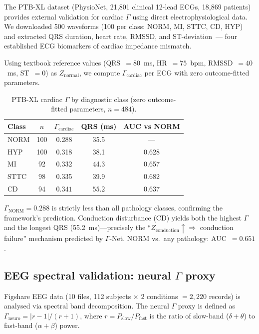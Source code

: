 \documentclass[aps,pre,twocolumn,superscriptaddress,floatfix]{revtex4-2}
\begin{document}
The PTB-XL dataset (PhysioNet, 21,801 clinical 12-lead ECGs,
18,869 patients) provides external validation for cardiac
$\Gamma$ using direct electrophysiological data.
We downloaded 500 waveforms (100 per class: NORM, MI, STTC,
CD, HYP) and extracted QRS duration, heart rate,
RMSSD, and ST-deviation~--- four established ECG biomarkers
of cardiac impedance mismatch.

Using textbook reference values (QRS~$= 80$~ms, HR~$= 75$~bpm,
RMSSD~$= 40$~ms, ST~$= 0$) as $Z_{\text{normal}}$,
we compute $\Gamma_{\text{cardiac}}$ per ECG with
zero outcome-fitted parameters.

\begin{table}[h]
\centering
\caption{PTB-XL cardiac $\Gamma$ by diagnostic class
  (zero outcome-fitted parameters, $n = 484$).}
\label{tab:ptbxl}
\begin{tabular}{lcccc}
\toprule
Class & $n$ & $\Gamma_{\text{cardiac}}$ & QRS (ms) & AUC vs NORM \\
\midrule
NORM  & 100 & 0.288     & 35.5 & ---   \\
HYP   & 100 & 0.318     & 38.1 & 0.628 \\
MI    &  92 & 0.332     & 44.3 & 0.657 \\
STTC  &  98 & 0.335     & 39.9 & $\mathbf{0.682}$ \\
CD    &  94 & $\mathbf{0.341}$ & $\mathbf{55.2}$ & 0.637 \\
\bottomrule
\end{tabular}
\end{table}

$\Gamma_{\text{NORM}} = 0.288$ is strictly less than
all pathology classes, confirming the framework's prediction.
Conduction disturbance (CD) yields both the highest $\Gamma$
and the longest QRS (55.2~ms)---precisely the
``$Z_{\text{conduction}} \uparrow \Rightarrow$
conduction failure'' mechanism predicted by $\Gamma$-Net.
NORM vs.\ any pathology: AUC~$= 0.651$.


\subsection{EEG spectral validation: neural $\Gamma$ proxy}
\label{sec:eeg}

Figshare EEG data (10 files, 112 subjects $\times$ 2 conditions
$= 2{,}220$ records) is analysed via spectral band
decomposition.
The neural $\Gamma$ proxy is defined as
$\Gamma_{\text{neuro}} = |r - 1| / (r + 1)$,
where $r = P_{\text{slow}} / P_{\text{fast}}$
is the ratio of slow-band ($\delta + \theta$) to
fast-band ($\alpha + \beta$) power.
\end{document}
